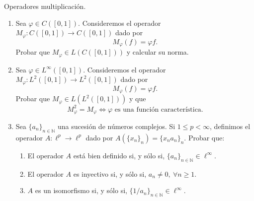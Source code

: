 \documentclass{article}
\theoremstyle{definition}
\newcommand{\N}{\mathbb{N}}
\newenvironment{ejercicio}[1]{\begin{trivlist}
\item[\hskip \labelsep {\bfseries Ejercicio}\hskip \labelsep {\bfseries #1.}]}{\end{trivlist}}
\begin{document}
\vspace{0.5cm}

\begin{ejercicio}{10}
    Operadores multiplicación.
    \begin{enumerate}
        \item Sea \(\varphi\in C([0,1])\). Consideremos el operador \(M_\varphi:C([0,1])\to C([0,1])\) dado por
              \[
                  M_\varphi(f)=\varphi f.
              \]
              Probar que \(M_\varphi\in L(C([0,1]))\) y calcular su norma.
        \item Sea \(\varphi\in L^\infty([0,1])\). Consideremos el operador \(M_\varphi:L^2([0,1])\to L^2([0,1])\) dado por
              \[
                  M_\varphi(f)=\varphi f.
              \]
              Probar que \(M_\varphi\in L(L^2([0,1]))\) y que
              \[
                  M_\varphi^2=M_\varphi \iff \varphi \text{ es una función característica.}
              \]
        \item Sea \({\{a_n\}}_{n\in\N}\) una sucesión de números complejos. Si \( 1 \leq p < \infty \), definimos el operador \(A:\ell^p\to\ell^p\) dado por \(A ({\{x_n\}}_n) = {\{x_n a_n\}}_n\). Probar que:
              \begin{enumerate}
                  \item El operador \(A\) está bien definido si, y sólo si, \({\{a_n\}}_{n\in\N} \in \ell^\infty \).
                  \item El operador \(A\) es inyectivo si, y sólo si, \( a_n \neq 0,\ \forall n \geq 1 \).
                  \item \(A\) es un isomorfismo si, y sólo si, \( {\{1/a_n\}}_{n\in\N} \in \ell^\infty \).
              \end{enumerate}
    \end{enumerate}
\end{ejercicio}
\end{document}
